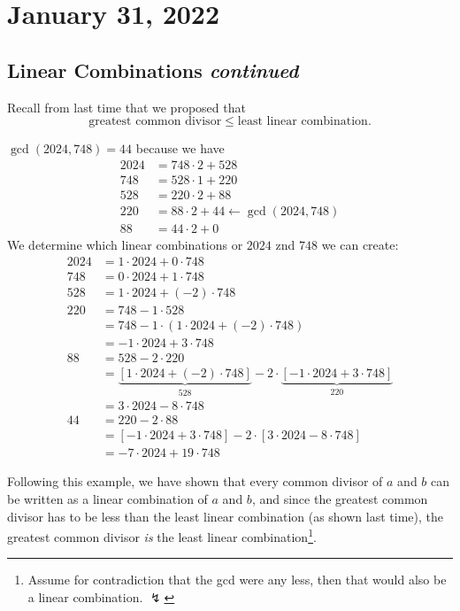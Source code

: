 \section{January 31, 2022}
\subsection{Linear Combinations \emph{continued}}
Recall from last time that we proposed that
\[\text{greatest common divisor} \leq \text{least linear combination}.\]
\begin{example}
    $\gcd(2024, 748)=44$ because we have
    \begin{align*}
        2024 & = 748\cdot 2 + 528                                  \\
        748  & = 528\cdot 1 + 220                                  \\
        528  & = 220\cdot 2 + 88                                   \\
        220  & = 88\cdot 2 + \boxed{44} \leftarrow \gcd(2024, 748) \\
        88   & = 44\cdot 2 + 0
    \end{align*}
    We determine which linear combinations or $2024$ znd $748$ we can create:
    \begin{align*}
        2024 & = 1\cdot 2024 + 0\cdot 748                         \\
        748  & = 0\cdot 2024 + 1\cdot 748                         \\
        528  & = 1\cdot 2024 + (-2)\cdot 748                      \\
        220  & = 748 - 1\cdot 528                                 \\
             & = 748 - 1\cdot (1\cdot 2024 + (-2)\cdot 748)       \\
             & = -1\cdot 2024 + 3\cdot 748                        \\
        88   & = 528 - 2\cdot 220                                 \\
             & = \underbrace{[1\cdot 2024 + (-2)\cdot 748]}_{528}
        - 2\cdot \underbrace{[-1\cdot 2024 + 3\cdot 748]}_{220}   \\
             & = 3\cdot 2024 - 8\cdot 748                         \\
        44   & = 220 - 2\cdot 88                                  \\
             & = [-1\cdot 2024 + 3\cdot 748]
        - 2\cdot [3\cdot 2024 - 8\cdot 748]                       \\
             & = -7\cdot 2024 + 19\cdot 748
    \end{align*}
\end{example}
Following this example, we have shown that every common divisor of $a$ and $b$ can be written as a linear combination of $a$ and $b$, and since the greatest common divisor has to be less than the least linear combination (as shown last time), the greatest common divisor \emph{is} the least linear combination\footnote{Assume for contradiction that the gcd were any less, then that would also be a linear combination. $\lightning$}.

